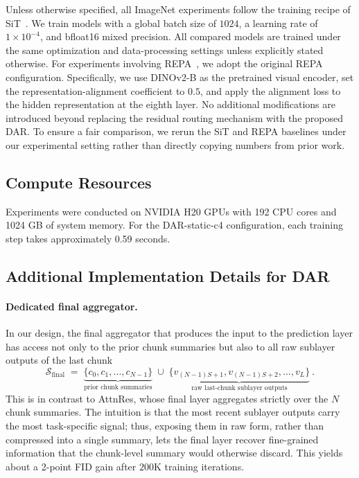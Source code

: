 \documentclass[]{ant_tech_report}
\begin{document}
Unless otherwise specified, all ImageNet experiments follow the training recipe of SiT~\citep{ma2024sit}. We train models with a global batch size of $1024$, a learning rate of $1 \times 10^{-4}$, and bfloat16 mixed precision. All compared models are trained under the same optimization and data-processing settings unless explicitly stated otherwise. For experiments involving REPA~\citep{yu2025repa}, we adopt the original REPA configuration. Specifically, we use DINOv2-B as the pretrained visual encoder, set the representation-alignment coefficient to $0.5$, and apply the alignment loss to the hidden representation at the eighth layer. No additional modifications are introduced beyond replacing the residual routing mechanism with
the proposed \textsc{DAR}. To ensure a fair comparison, we rerun the SiT and REPA baselines under our experimental setting rather than directly copying numbers from prior work.

\subsection{Compute Resources}
Experiments were conducted on NVIDIA H20 GPUs with 192 CPU cores and 1024 GB of system memory. For the DAR-static-c4 configuration, each training step takes approximately 0.59 seconds.

\subsection{Additional Implementation Details for DAR}

\paragraph{Dedicated final aggregator.} In our design, the final aggregator that produces the input to the prediction layer has access not only to the prior chunk summaries but also to all raw sublayer outputs of the last chunk        
\begin{equation}
\mathcal{S}_{\text{final}} \;=\; \underbrace{\{c_0, c_1, \ldots, c_{N-1}\}}_{\text{prior chunk summaries}} \;\cup\;               
\underbrace{\{v_{(N-1)S+1}, v_{(N-1)S+2}, \ldots, v_L\}}_{\text{raw last-chunk sublayer outputs}} \ .                                    
\end{equation}
This is in contrast to AttnRes, whose final layer aggregates strictly over the $N$ chunk summaries. The intuition is that the most recent sublayer outputs carry the most task-specific signal; thus, exposing them in raw form, rather than compressed into a single summary, lets the final layer recover fine-grained information that the chunk-level summary would otherwise discard. This yields about a 2-point FID gain after $200\text{K}$ training iterations.
\end{document}
